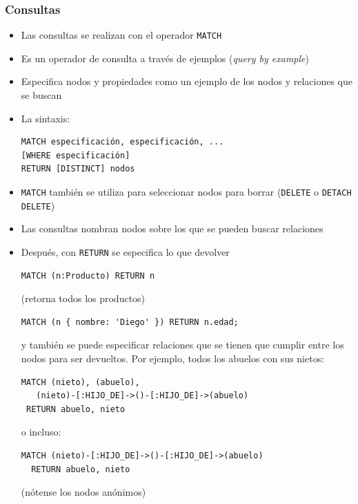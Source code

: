 \documentclass[14pt]{beamer}
\begin{document}
\begin{frame}
  \frametitle{Consultas}
  \begin{itemize}
  \item Las consultas se realizan con el operador {\tt MATCH}
  \item Es un operador de consulta a través de ejemplos ({\em query by
      example})
\item Especifica nodos y propiedades como un ejemplo de los nodos y
  relaciones que se buscan
\item La sintaxis:

\begin{lstlisting}[language=cypher]
MATCH especificación, especificación, ...
[WHERE especificación]
RETURN [DISTINCT] nodos
\end{lstlisting}

\item {\tt MATCH} también se utiliza para seleccionar nodos para borrar
  ({\tt DELETE} o {\tt DETACH DELETE})

  \item Las consultas nombran nodos sobre los que se pueden buscar
    relaciones
\item Después, con {\tt RETURN} se especifica lo que devolver
\begin{lstlisting}[language=cypher]
MATCH (n:Producto) RETURN n
\end{lstlisting}
(retorna todos los productos)

\begin{lstlisting}[language=cypher]
MATCH (n { nombre: 'Diego' }) RETURN n.edad;
\end{lstlisting}

y también se puede especificar relaciones que se tienen que cumplir entre
los nodos para ser devueltos. Por ejemplo, todos los abuelos con sus
nietos:

\begin{lstlisting}[language=cypher]
MATCH (nieto), (abuelo),
   (nieto)-[:HIJO_DE]->()-[:HIJO_DE]->(abuelo)
 RETURN abuelo, nieto
\end{lstlisting}
o incluso:
\begin{lstlisting}[language=cypher]
MATCH (nieto)-[:HIJO_DE]->()-[:HIJO_DE]->(abuelo)
  RETURN abuelo, nieto
\end{lstlisting}

(nótense los nodos anónimos)
  \end{itemize}
\end{frame}
\end{document}
